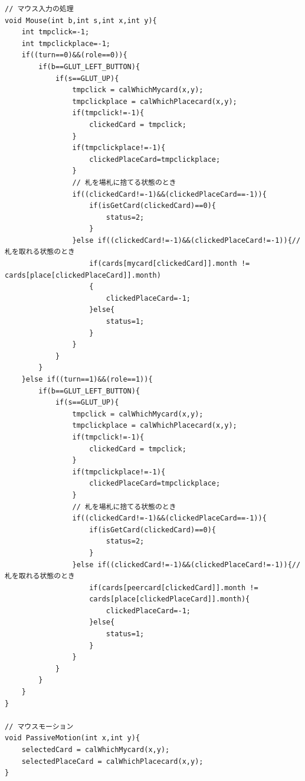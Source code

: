 \documentclass[a4j]{jarticle}
\begin{document}
    \begin{lstlisting}[basicstyle=\ttfamily\footnotesize, frame=single,label=mouse,caption=マウス入力の処理]
// マウス入力の処理
void Mouse(int b,int s,int x,int y){
    int tmpclick=-1;
    int tmpclickplace=-1;
    if((turn==0)&&(role==0)){
        if(b==GLUT_LEFT_BUTTON){
            if(s==GLUT_UP){
                tmpclick = calWhichMycard(x,y);
                tmpclickplace = calWhichPlacecard(x,y);
                if(tmpclick!=-1){
                    clickedCard = tmpclick;
                }
                if(tmpclickplace!=-1){
                    clickedPlaceCard=tmpclickplace;
                }            
                // 札を場札に捨てる状態のとき
                if((clickedCard!=-1)&&(clickedPlaceCard==-1)){
                    if(isGetCard(clickedCard)==0){
                        status=2;
                    }
                }else if((clickedCard!=-1)&&(clickedPlaceCard!=-1)){// 札を取れる状態のとき
                    if(cards[mycard[clickedCard]].month != cards[place[clickedPlaceCard]].month)
                    {
                        clickedPlaceCard=-1;
                    }else{
                        status=1;
                    }
                }
            }
        }
    }else if((turn==1)&&(role==1)){
        if(b==GLUT_LEFT_BUTTON){
            if(s==GLUT_UP){
                tmpclick = calWhichMycard(x,y);
                tmpclickplace = calWhichPlacecard(x,y);
                if(tmpclick!=-1){
                    clickedCard = tmpclick;
                }
                if(tmpclickplace!=-1){
                    clickedPlaceCard=tmpclickplace;
                }            
                // 札を場札に捨てる状態のとき
                if((clickedCard!=-1)&&(clickedPlaceCard==-1)){
                    if(isGetCard(clickedCard)==0){
                        status=2;
                    }
                }else if((clickedCard!=-1)&&(clickedPlaceCard!=-1)){// 札を取れる状態のとき
                    if(cards[peercard[clickedCard]].month != 
                    cards[place[clickedPlaceCard]].month){
                        clickedPlaceCard=-1;
                    }else{
                        status=1;
                    }
                }
            }
        }
    }
}

// マウスモーション
void PassiveMotion(int x,int y){
    selectedCard = calWhichMycard(x,y);
    selectedPlaceCard = calWhichPlacecard(x,y);
}
    \end{lstlisting}
\end{document}
